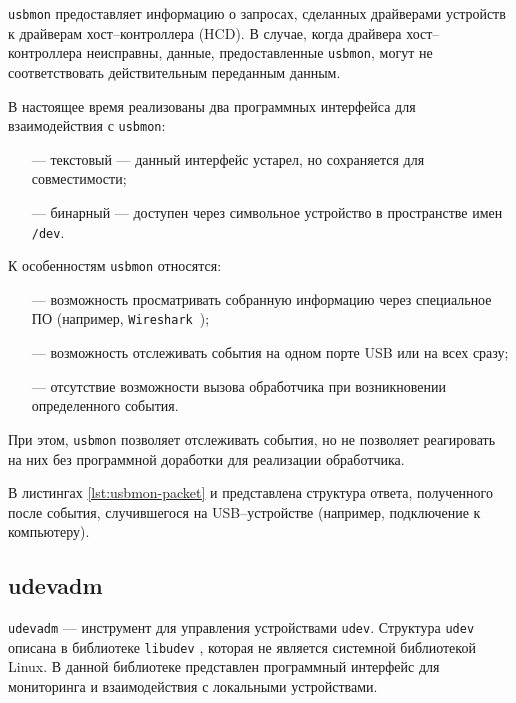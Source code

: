 \texttt{usbmon} предоставляет информацию о запросах, сделанных драйверами устройств к драйверам хост--контроллера (HCD). В случае, когда драйвера хост--контроллера неисправны, данные, предоставленные \texttt{usbmon}, могут не соответствовать действительным переданным данным.

В настоящее время реализованы два программных интерфейса для взаимодействия с \texttt{usbmon}: 
\begin{itemize}
    \item[---] текстовый --- данный интерфейс устарел, но сохраняется для совместимости;
    \item[---] бинарный --- доступен через символьное устройство в пространстве имен \texttt{/dev}.
\end{itemize}

К особенностям \texttt{usbmon} относятся:

\begin{itemize}
	\item[---] возможность просматривать собранную информацию через специальное ПО (например, \texttt{Wireshark}~\cite{wireshark});
	\item[---] возможность отслеживать события на одном порте USB или на всех сразу;
	\item[---] отсутствие возможности вызова обработчика при возникновении определенного события.
\end{itemize}

При этом, \texttt{usbmon} позволяет отслеживать события, но не позволяет реагировать на них без программной доработки для реализации обработчика.

В листингах \ref{lst:usbmon-packet} и  представлена структура ответа, полученного после события, случившегося на USB--устройстве (например, подключение к компьютеру).



\subsection{udevadm}

\texttt{udevadm} \cite{udevadm} --- инструмент для управления устройствами \texttt{udev}. Структура \texttt{udev} описана в библиотеке \texttt{libudev} \cite{libudev}, которая не является системной библиотекой Linux. В данной библиотеке представлен программный интерфейс для мониторинга и взаимодействия с локальными устройствами.

